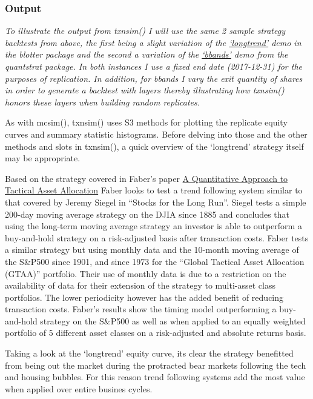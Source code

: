 \hypertarget{output}{%
\subsubsection{Output}\label{output}}

\emph{To illustrate the output from txnsim() I will use the same 2
sample strategy backtests from above, the first being a slight variation
of the
\href{https://github.com/braverock/blotter/blob/master/demo/longtrend.R}{`longtrend'}
demo in the blotter package and the second a variation of the
\href{https://github.com/braverock/quantstrat/blob/master/demo/bbands.R}{`bbands'}
demo from the quantstrat package. In both instances I use a fixed end
date (2017-12-31) for the purposes of replication. In addition, for
bbands I vary the exit quantity of shares in order to generate a
backtest with layers thereby illustrating how txnsim() honors these
layers when building random replicates.}

As with mcsim(), txnsim() uses S3 methods for plotting the replicate
equity curves and summary statistic histograms. Before delving into
those and the other methods and slots in txnsim(), a quick overview of
the `longtrend' strategy itself may be appropriate.

Based on the strategy covered in Faber's paper
\href{https://papers.ssrn.com/sol3/papers.cfm?abstract_id=962461}{A
Quantitative Approach to Tactical Asset Allocation} Faber looks to test
a trend following system similar to that covered by Jeremy Siegel in
``Stocks for the Long Run''. Siegel tests a simple 200-day moving
average strategy on the DJIA since 1885 and concludes that using the
long-term moving average strategy an investor is able to outperform a
buy-and-hold strategy on a risk-adjusted basis after transaction costs.
Faber tests a similar strategy but using monthly data and the 10-month
moving average of the S\&P500 since 1901, and since 1973 for the
``Global Tactical Asset Allocation (GTAA)'' portfolio. Their use of
monthly data is due to a restriction on the availability of data for
their extension of the strategy to multi-asset class portfolios. The
lower periodicity however has the added benefit of reducing transaction
costs. Faber's results show the timing model outperforming a
buy-and-hold strategy on the S\&P500 as well as when applied to an
equally weighted portfolio of 5 different asset classes on a
risk-adjusted and absolute returns basis.

Taking a look at the `longtrend' equity curve, its clear the strategy
benefitted from being out the market during the protracted bear markets
following the tech and housing bubbles. For this reason trend following
systems add the most value when applied over entire busines cycles.

